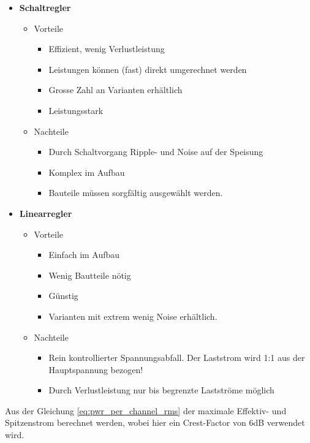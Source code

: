 \begin{itemize}
	\item[] \textbf{\large Schaltregler}
	\begin{itemize}
		\item Vorteile
		\begin{itemize}
			\item [\bullet]Effizient, wenig Verlustleistung
			\item [\bullet]Leistungen können (fast) direkt umgerechnet werden
			\item [\bullet]Grosse Zahl an Varianten erhältlich
			\item [\bullet]Leistungsstark
		\end{itemize}
		\item Nachteile
		\begin{itemize}
			\item [\bullet]Durch Schaltvorgang Ripple- und Noise auf der Speisung
			\item [\bullet]Komplex im Aufbau
			\item [\bullet]Bauteile müssen sorgfältig ausgewählt werden.
		\end{itemize}
	\end{itemize}
	\item[] \textbf{\large Linearregler}
	\begin{itemize}
		\item Vorteile
		\begin{itemize}
			\item [\bullet]Einfach im Aufbau
			\item [\bullet]Wenig Bautteile nötig
			\item [\bullet]Günstig
			\item [\bullet]Varianten mit extrem wenig Noise erhältlich.
		\end{itemize}
		\item Nachteile
		\begin{itemize}
			\item [\bullet]Rein \textquotedbl{}kontrollierter Spannungsabfall\textquotedbl{}. Der Laststrom wird 1:1 aus der Hauptspannung bezogen!
			\item [\bullet]Durch Verlustleistung nur bis begrenzte Lastströme möglich
		\end{itemize}
	\end{itemize}
\end{itemize}
Aus der Gleichung \ref{eq:pwr_per_channel_rms} der maximale Effektiv- und Spitzenstrom berechnet werden, wobei hier ein Crest-Factor von 6dB verwendet wird.
